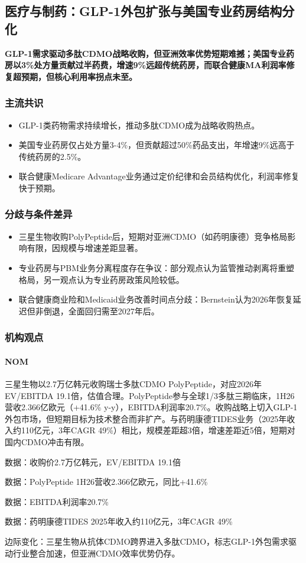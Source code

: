 \documentclass[11pt]{ctexart}
\begin{document}
\subsection{医疗与制药：GLP-1外包扩张与美国专业药房结构分化}
\textbf{GLP-1需求驱动多肽CDMO战略收购，但亚洲效率优势短期难撼；美国专业药房以3\%处方量贡献过半药费，增速9\%远超传统药房，而联合健康MA利润率修复超预期，但核心利用率拐点未至。}
\subsubsection*{主流共识}
\begin{itemize}
  \item GLP-1类药物需求持续增长，推动多肽CDMO成为战略收购热点。
  \item 美国专业药房仅占处方量3-4\%，但贡献超过50\%药品支出，年增速9\%远高于传统药房的2.5\%。
  \item 联合健康Medicare Advantage业务通过定价纪律和会员结构优化，利润率修复快于预期。
\end{itemize}
\subsubsection*{分歧与条件差异}
\begin{itemize}
  \item 三星生物收购PolyPeptide后，短期对亚洲CDMO（如药明康德）竞争格局影响有限，因规模与增速差距显著。
  \item 专业药房与PBM业务分离程度存在争议：部分观点认为监管推动剥离将重塑格局，另一观点认为专业药房政策风险较低。
  \item 联合健康商业险和Medicaid业务改善时间点分歧：Bernstein认为2026年恢复延迟但非倒退，全面回归需至2027年后。
\end{itemize}
\subsubsection*{机构观点}
\paragraph{NOM} 三星生物以2.7万亿韩元收购瑞士多肽CDMO PolyPeptide，对应2026年EV/EBITDA 19.1倍，估值合理。PolyPeptide参与全球1/3多肽三期临床，1H26营收2.366亿欧元（+41.6\% y-y），EBITDA利润率20.7\%。收购战略上切入GLP-1外包市场，但短期目标为技术整合而非扩产。与药明康德TIDES业务（2025年收入约110亿元，3年CAGR 49\%）相比，规模差距超3倍，增速差距近5倍，短期对国内CDMO冲击有限。
{\small\color{refgray}数据：收购价2.7万亿韩元，EV/EBITDA 19.1倍\par}
{\small\color{refgray}数据：PolyPeptide 1H26营收2.366亿欧元，同比+41.6\%\par}
{\small\color{refgray}数据：EBITDA利润率20.7\%\par}
{\small\color{refgray}数据：药明康德TIDES 2025年收入约110亿元，3年CAGR 49\%\par}
{\small\color{refgray}边际变化：三星生物从抗体CDMO跨界进入多肽CDMO，标志GLP-1外包需求驱动行业整合加速，但亚洲CDMO效率优势仍存。\par}
\end{document}
